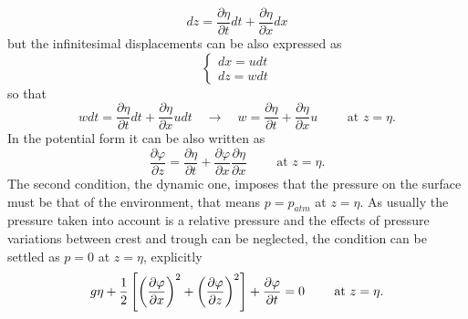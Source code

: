 \begin{equation*}
dz=\dfrac{\partial\eta}{\partial t}dt+\dfrac{\partial\eta}{\partial x}dx
\end{equation*}
but the infinitesimal displacements can be also expressed as
\begin{equation*}
\left\lbrace\begin{array}{l}
dx=udt\\
dz=wdt
\end{array}\right.
\end{equation*}
so that 
\begin{equation}
wdt=\dfrac{\partial\eta}{\partial t}dt+\dfrac{\partial\eta}{\partial x}udt    \quad \rightarrow   \quad 
w=\dfrac{\partial\eta}{\partial t}+\dfrac{\partial\eta}{\partial x}u   \qquad  \text{ at } z=\eta.
\end{equation}
In the potential form it can be also written as
\begin{equation}
\dfrac{\partial\varphi}{\partial z}=\dfrac{\partial\eta}{\partial t}+\dfrac{\partial\varphi}{\partial x}\dfrac{\partial\eta}{\partial x}   \qquad  \text{ at } z=\eta.
\end{equation}
The second condition, the dynamic one, imposes that the pressure on the surface must be that of the environment, that means $p=p_{atm}$ at $z=\eta$. As usually the pressure taken into account is a relative pressure and the effects of pressure variations between crest and trough can be neglected, the condition can be settled as $p=0$ at $z=\eta$, explicitly
\begin{equation}
g\eta + \dfrac{1}{2}\left[ \left( \dfrac{\partial\varphi}{\partial x} \right)^{2}+\left( \dfrac{\partial\varphi}{\partial z} \right)^{2} \right] +\dfrac{\partial \varphi}{\partial t}=0\qquad  \text{ at } z=\eta.
\end{equation}
